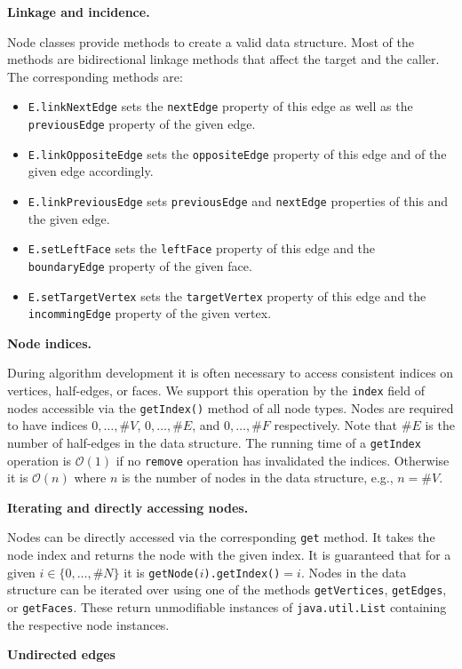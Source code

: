 \documentclass[Thesis.tex]{subfiles}
\begin{document}
{\bf Linkage and incidence.}

Node classes provide methods to create a valid data structure. Most of the methods are bidirectional linkage methods that affect the target and the caller. The corresponding methods are:
\begin{itemize}
\item {\tt E.linkNextEdge} sets the {\tt nextEdge} property of this edge as well as the 
{\tt previousEdge} property of the given edge.
\item {\tt E.linkOppositeEdge} sets the {\tt oppositeEdge} property of this edge and of the given edge accordingly.
\item {\tt E.linkPreviousEdge} sets {\tt previousEdge} and {\tt nextEdge} properties of this and the given edge.
\item {\tt E.setLeftFace} sets the {\tt leftFace} property of this edge and the {\tt boundaryEdge} property of the given face.
\item {\tt E.setTargetVertex} sets the {\tt targetVertex} property of this edge and the 
{\tt incommingEdge} property of the given vertex.
\end{itemize}

{\bf Node indices.}

During algorithm development it is often necessary to access consistent indices on vertices,
half-edges, or faces. We support this operation by the {\tt index} field of nodes accessible via
the {\tt getIndex()} method of all node types. Nodes are required to have indices $0,\ldots,\#V$,
$0,\ldots,\#E$, and $0,\ldots,\#F$ respectively. Note that $\#E$ is the number of half-edges
in the data structure. The running time of a {\tt getIndex} operation is $\mathcal{O}(1)$ if
no {\tt remove} operation has invalidated the indices. Otherwise it is $\mathcal{O}(n)$ where
$n$ is the number of nodes in the data structure, e.g., $n=\#V$.

{\bf Iterating and directly accessing nodes.}

Nodes can be directly accessed via the corresponding {\tt get} method. It takes the node index
and returns the node with the given index. It is guaranteed that for a given $i\in \{0,\ldots,\#N\}$
it is {\tt getNode($i$).getIndex()$ = i$}.
Nodes in the data structure can be iterated over using one of the methods {\tt getVertices}, 
{\tt getEdges}, or {\tt getFaces}. These return unmodifiable instances of {\tt java.util.List} containing the respective node instances.

{\bf Undirected edges}
\end{document}
